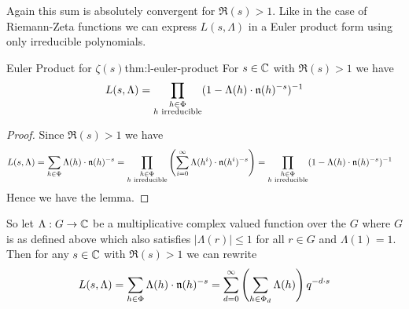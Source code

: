  Again this sum is absolutely convergent for $\Re(s)>1$. Like in the case of Riemann-Zeta functions we can express $L(s,\Lambda)$ in a Euler product form using only irreducible polynomials.
\begin{Theorem}{Euler Product for $\zeta(s)$}{thm:l-euler-product}%
  For $s\in\mathbb{C}$ with $\Re(s)>1$ we have $$L(s,\Lambda)=\prod_{\substack{h\in\Phi\\ h\text{ irreducible}}}(1-\Lambda(h)\cdot \mathfrak{n}(h)^{-s})^{-1}$$
\end{Theorem}
\begin{proof}
  Since $\Re(s)>1$ we have \begin{align*}
    L(s,\Lambda) & = \sum_{h\in\Phi}\Lambda(h)\cdot \mathfrak{n}(h)^{-s} = \prod_{\substack{h\in\Phi\\ h\text{ irreducible}}} \left(\sum_{i=0}^{\infty} \Lambda(h^i)\cdot \mathfrak{n}(h^i)^{-s} \right) = \prod_{\substack{h\in\Phi\\ h\text{ irreducible}}}(1-\Lambda(h)\cdot \mathfrak{n}(h)^{-s})^{-1}
  \end{align*}Hence we have the lemma.
\end{proof}
So let $\Lambda:G\to\mathbb{C}$ be a multiplicative complex valued function over the $G$ where $G$ is as defined above which also satisfies $|\Lambda(r)|\leq 1$ for all $r\in G$ and $\Lambda(1)=1$. Then for any $s\in\mathbb{C}$ with $\Re(s)>1$ we can rewrite $$L(s,\Lambda)=\sum_{h\in\Phi}\Lambda(h)\cdot \mathfrak{n}(h)^{-s}=\sum_{d=0}^{\infty}\left(\sum_{h\in\Phi_d}\Lambda(h)\right)q^{-d\cdot s}$$
